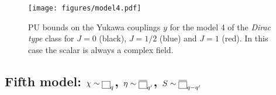 \documentclass[a4paper,11pt]{article}
\begin{document}
\begin{figure}[t!]
\begin{center}
\texttt{[image: figures/model4.pdf]} 
\caption{\small PU bounds on the Yukawa couplings $y$ for the model 4 of the {\emph{Dirac type}} class
for $J=0$ (black), $J=1/2$ (blue) and $J=1$ (red).
In this case the scalar is always a complex field. }
\label{fig:model4}
\end{center}
\end{figure}







\subsection{Fifth model: $\chi\sim {\tiny{\fbox{$\protect\phantom s$} }}_q$, 
$\eta\sim  {\overline{{\tiny{\fbox{$\protect\phantom s$} }}}}_{q^\prime}$, $S\sim{\overline{ {\tiny{\fbox{$\protect\phantom s$}}} }}_{q-q^\prime}$  }\label{sec:model5}
\end{document}
